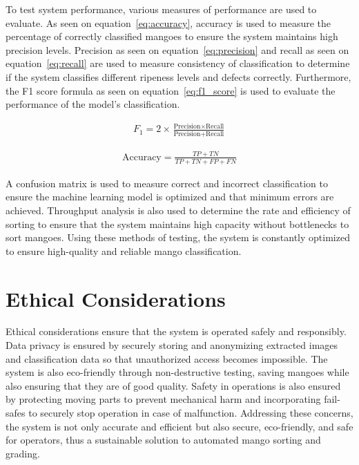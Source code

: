 To test system performance, various measures of performance are used to evaluate. As seen on equation~\ref{eq:accuracy}, accuracy is used to measure the percentage of correctly classified mangoes to ensure the system maintains high precision levels. Precision as seen on equation~\ref{eq:precision} and recall as seen on equation~\ref{eq:recall} are used to measure consistency of classification to determine if the system classifies different ripeness levels and defects correctly. Furthermore, the F1 score formula as seen on equation~\ref{eq:f1_score} is used to evaluate the performance of the model's classification. 

\begin{eqnarray}
	F_1 = 2\times \frac{\text{Precision} \times \text{Recall}}{\text{Precision} + \text{Recall}}
	\label{eq:f1_score}
\end{eqnarray}

\begin{eqnarray}
	\text{Accuracy} = \frac{TP + TN}{TP + TN + FP + FN}
	\label{eq:accuracy}
\end{eqnarray}

A confusion matrix is used to measure correct and incorrect classification to ensure the machine learning model is optimized and that minimum errors are achieved. Throughput analysis is also used to determine the rate and efficiency of sorting to ensure that the system maintains high capacity without bottlenecks to sort mangoes. Using these methods of testing, the system is constantly optimized to ensure high-quality and reliable mango classification.

\section{Ethical Considerations}
Ethical considerations ensure that the system is operated safely and responsibly. Data privacy is ensured by securely storing and anonymizing extracted images and classification data so that unauthorized access becomes impossible. The system is also eco-friendly through non-destructive testing, saving mangoes while also ensuring that they are of good quality. Safety in operations is also ensured by protecting moving parts to prevent mechanical harm and incorporating fail-safes to securely stop operation in case of malfunction. Addressing these concerns, the system is not only accurate and efficient but also secure, eco-friendly, and safe for operators, thus a sustainable solution to automated mango sorting and grading.

